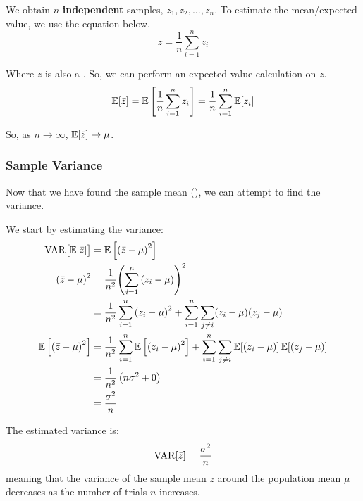 We obtain $n$ \textbf{independent} samples, $z_{1}, z_{2}, \ldots, z_{n}$.
To estimate the mean/expected value, we use the equation below.
\begin{equation}\label{eq:Sample_Mean}
  \bar{z} = \frac{1}{n} \sum\limits_{i=1}^{n}z_{i}
\end{equation}

Where $\bar{z}$ is also a .
So, we can perform an expected value calculation on $\bar{z}$.
\begin{equation}\label{eq:Sample_Expected_Value}
  \operatorname{\operatorname{\mathbb{E}}}[\bar{z}] = \operatorname{\operatorname{\mathbb{E}}} \left[ \frac{1}{n} \sum\limits_{i=1}^{n} z_{i} \right] = \frac{1}{n} \sum\limits_{i=1}^{n} \operatorname{\operatorname{\mathbb{E}}}[z_{i}]
\end{equation}

So, as $n \to \infty$, $\operatorname{\operatorname{\mathbb{E}}}[\bar{z}] \to \mu$.

\subsubsection{Sample Variance}\label{subsubsec:sample_Variance}
Now that we have found the sample mean (), we can attempt to find the variance.

We start by estimating the variance:
\begin{align*}
  \operatorname{\operatorname{VAR}} \bigl[ \operatorname{\operatorname{\mathbb{E}}}[\bar{z}] \bigr] &= \operatorname{\operatorname{\mathbb{E}}} \left[ {(\bar{z} - \mu)}^{2} \right] \\
  {(\bar{z} - \mu)}^{2} &= \frac{1}{n^{2}} {\left( \sum\limits_{i=1}^{n} \left(z_{i} - \mu \right) \right)}^{2} \\
                                                  &= \frac{1}{n^{2}} \sum\limits_{i=1}^{n} {(z_{i} - \mu)}^{2} + \sum\limits_{i=1}^{n}\sum\limits_{j \neq i} (z_{i} - \mu) (z_{j} - \mu) \\
  \operatorname{\operatorname{\mathbb{E}}} \left[ {(\bar{z} - \mu)}^{2} \right] &= \frac{1}{n^{2}} \sum\limits_{i=1}^{n} \operatorname{\operatorname{\mathbb{E}}} \left[ {(z_{i} - \mu)}^{2} \right] + \sum\limits_{i=1}^{n}\sum\limits_{j \neq i} \operatorname{\operatorname{\mathbb{E}}}[(z_{i}-\mu)] \operatorname{\operatorname{\mathbb{E}}}[(z_{j} - \mu)] \\
                                                  &= \frac{1}{n^{2}} \left( n \sigma^{2} + 0 \right) \\
                                                  &= \frac{\sigma^{2}}{n}
\end{align*}

The estimated variance is:
\begin{equation*}
  \operatorname{\operatorname{VAR}}[\bar{z}] = \frac{\sigma^{2}}{n}
\end{equation*}
meaning that the variance of the sample mean $\bar{z}$ around the population mean $\mu$ decreases as the number of trials $n$ increases.

